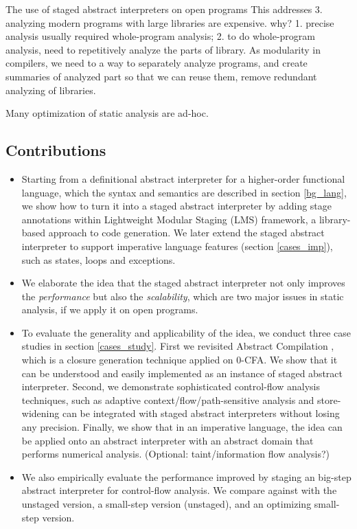 The use of staged abstract interpreters on open programs 
This addresses 
3. analyzing modern programs with large libraries are expensive. 
why? 1. precise analysis usually required whole-program analysis; 2. to do whole-program analysis, need to 
repetitively analyze the parts of library.
As modularity in compilers, we need to a way to separately analyze programs, and create summaries of analyzed 
part so that we can reuse them, remove redundant analyzing of libraries.

Many optimization of static analysis are ad-hoc.

\subsection{Contributions}

\begin{itemize}
\item Starting from a definitional abstract interpreter for a higher-order functional language,
  which the syntax and semantics are described in section \ref{bg_lang},
  we show how to turn it into a staged abstract interpreter by adding stage annotations within
  Lightweight Modular Staging (LMS) framework, a library-based approach to code generation. 
  We later extend the staged abstract interpreter to support imperative language features 
  (section \ref{cases_imp}), such as states, loops and exceptions.
\item We elaborate the idea that the staged abstract interpreter not only improves the \textit{performance}
  but also the \textit{scalability}, which are two major issues in static analysis, if we apply it on open
  programs. 
\item To evaluate the generality and applicability of the idea, we conduct three case studies in section \ref{cases_study}. 
  First we revisited Abstract Compilation \cite{Boucher:1996:ACN:647473.727587}, which is a closure generation 
  technique applied on 0-CFA. We show that it can be understood and easily implemented as an instance of 
  staged abstract interpreter. 
  Second, we demonstrate sophisticated control-flow analysis techniques, such as adaptive context/flow/path-sensitive 
  analysis and store-widening can be integrated with staged abstract interpreters without losing any precision.
  Finally, we show that in an imperative language, the idea can be applied onto an abstract interpreter with
  an abstract domain that performs numerical analysis.
  (Optional: taint/information flow analysis?)
\item We also empirically evaluate the performance improved by staging an big-step abstract interpreter 
  for control-flow analysis. We compare against with the unstaged version, a small-step version (unstaged), 
  and an optimizing small-step version.
\end{itemize}
